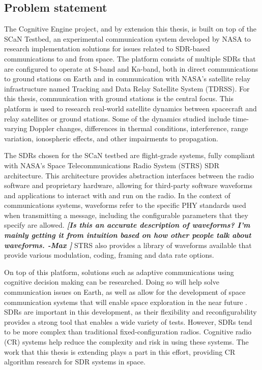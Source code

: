 	\subsection{Problem statement}
	\par The Cognitive Engine project, and by extension this thesis, is built on top of the SCaN Testbed, an experimental communication system developed by NASA to research implementation solutions for issues related to SDR-based communications to and from space. The platform consists of multiple SDRs that are configured to operate at S-band and Ka-band, both in direct communications to ground stations on Earth and in communication with NASA's satellite relay infrastructure named Tracking and Data Relay Satellite System (TDRSS). For this thesis, communication with ground stations is the central focus. This platform is used to research real-world satellite dynamics between spacecraft and relay satellites or ground stations. Some of the dynamics studied include time-varying Doppler changes, differences in thermal conditions, interference, range variation, ionospheric effects, and other impairments to propagation.
	\par The SDRs chosen for the SCaN testbed are flight-grade systems, fully compliant with NASA's Space Telecommunications Radio System (STRS) SDR architecture. This architecture provides abstraction interfaces between the radio software and proprietary hardware, allowing for third-party software waveforms and applications to interact with and run on the radio. In the context of communications systems, waveforms refer to the specific PHY standards used when transmitting a message, including the configurable parameters that they specify are allowed. \textbf{\textit{[Is this an accurate description of waveforms? I'm mainly getting it from intuition based on how other people talk about waveforms. -Max ]}} STRS also provides a library of waveforms available that provide various modulation, coding, framing and data rate options. 
	\par On top of this platform, solutions such as adaptive communications using cognitive decision making can be researched. Doing so will help solve communication issues on Earth, as well as allow for the development of space communication systems that will enable space exploration in the near future \cite{paulo_cite_131}. SDRs are important in this development, as their flexibility and reconfigurability provides a strong tool that enables a wide variety of tests. However, SDRs tend to be more complex than traditional fixed-configuration radios. Cognitive radio (CR) systems help reduce the complexity and risk in using these systems. The work that this thesis is extending plays a part in this effort, providing CR algorithm research for SDR systems in space.    
